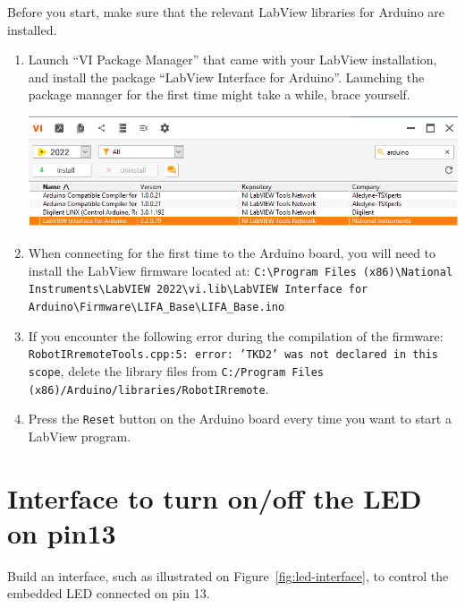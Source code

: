 \documentclass{labo}
\author{GEI}
\begin{document}

Before you start, make sure that the relevant LabView libraries for Arduino are installed.

\begin{enumerate}
  \item Launch ``VI Package Manager'' that came with your LabView installation, and install the package ``LabView Interface for Arduino''. Launching the package manager for the first time might take a while, brace yourself.
  \begin{center}
    \includegraphics[width=\linewidth]{VI-package-manager.png}
  \end{center}

  \item When connecting for the first time to the Arduino board, you will need to install the LabView firmware located at: \texttt{C:\textbackslash Program Files (x86)\textbackslash National Instruments\textbackslash LabVIEW 2022\textbackslash vi.lib\textbackslash LabVIEW Interface for Arduino\textbackslash Firmware\textbackslash LIFA\_Base\textbackslash LIFA\_Base.ino}

  \item If you encounter the following error during the compilation of the firmware: \texttt{RobotIRremoteTools.cpp:5: error: 'TKD2' was not declared in this scope}, delete the library files from \texttt{C:/Program Files (x86)/Arduino/libraries/RobotIRremote}.

  \item Press the \texttt{Reset} button on the Arduino board every time you want to start a LabView program.
\end{enumerate}




\section{Interface to turn on/off the LED on pin13}
Build an interface, such as illustrated on Figure~\ref{fig:led-interface}, to control the embedded LED connected on pin 13.
\end{document}

